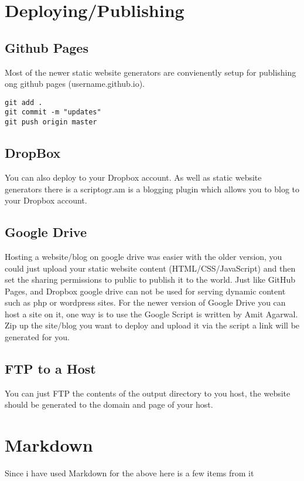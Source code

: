 \documentclass[12pt]{article}			%
\begin{document}
\newpage
\section{Deploying/Publishing}
\subsection{Github Pages}
Most of the newer static website generators are convienently setup for publishing ong github pages (username.github.io).
\begin{verbatim}
git add .
git commit -m "updates"
git push origin master
\end{verbatim}

\subsection{DropBox}
You can also deploy to your Dropbox account. As well as static website generators there is a scriptogr.am is a blogging plugin which allows you to blog to your Dropbox account.

\subsection{Google Drive}
Hosting a website/blog on google drive was easier with the older version, you could just upload your static website content (HTML/CSS/JavaScript) and then set the sharing permissions to public to publish it to the world. Just like GitHub Pages, and Dropbox google drive can not be used for serving dynamic content such as php or wordpress sites.
For the newer version of Google Drive you can host a site on it, one way is to use the Google Script is written by Amit Agarwal. Zip up the site/blog you want to deploy and upload it via the script a link will be generated for you.

\subsection{FTP to a Host}
You can just FTP the contents of the output directory to you host, the website should be generated to the domain and page of your host.




\newpage
\section{Markdown}
Since i have used Markdown for the above here is a few items from it
\end{document}
